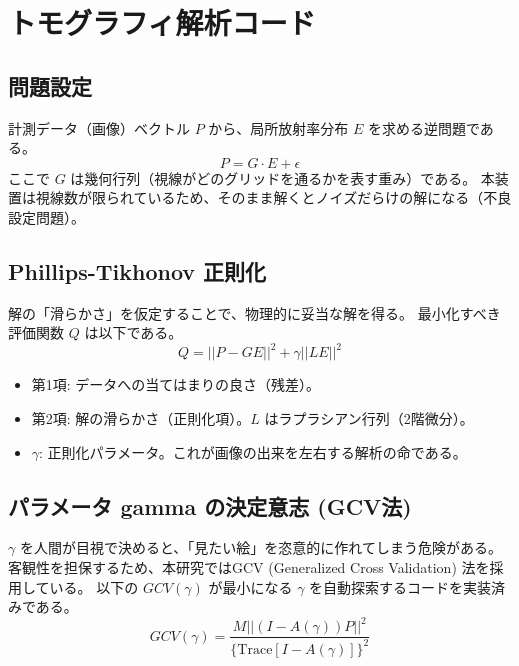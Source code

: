 \section{トモグラフィ解析コード}

\subsection{問題設定}
計測データ（画像）ベクトル $P$ から、局所放射率分布 $E$ を求める逆問題である。
\begin{equation}
    P = G \cdot E + \epsilon
\end{equation}
ここで $G$ は幾何行列（視線がどのグリッドを通るかを表す重み）である。
本装置は視線数が限られているため、そのまま解くとノイズだらけの解になる（不良設定問題）。

\subsection{Phillips-Tikhonov 正則化}
解の「滑らかさ」を仮定することで、物理的に妥当な解を得る。
最小化すべき評価関数 $Q$ は以下である\cite{Takeda2023}。
\begin{equation}
    Q = ||P - G E||^2 + \gamma ||L E||^2
\end{equation}
\begin{itemize}
    \item 第1項: データへの当てはまりの良さ（残差）。
    \item 第2項: 解の滑らかさ（正則化項）。$L$ はラプラシアン行列（2階微分）。
    \item $\gamma$: 正則化パラメータ。これが画像の出来を左右する解析の命である。
\end{itemize}

\subsection{パラメータ gamma の決定意志 (GCV法)}
$\gamma$ を人間が目視で決めると、「見たい絵」を恣意的に作れてしまう危険がある。
客観性を担保するため、本研究ではGCV (Generalized Cross Validation) 法を採用している。
以下の $GCV(\gamma)$ が最小になる $\gamma$ を自動探索するコードを実装済みである。
\begin{equation}
    GCV(\gamma) = \frac{M ||(I - A(\gamma)) P||^2}{\{\mathrm{Trace}[I - A(\gamma)]\}^2}
\end{equation}